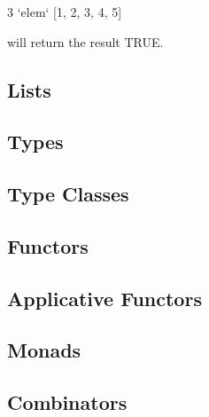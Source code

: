 \documentclass[thesis.tex]{subfiles}
\begin{document}
\begin{spec}
3 `elem` [1, 2, 3, 4, 5]
\end{spec}

will return the result TRUE.

\subsection{Lists}


\subsection{Types}

\subsection{Type Classes}

\subsection{Functors}

\subsection{Applicative Functors}

\subsection{Monads}

\subsection{Combinators}
\end{document}
